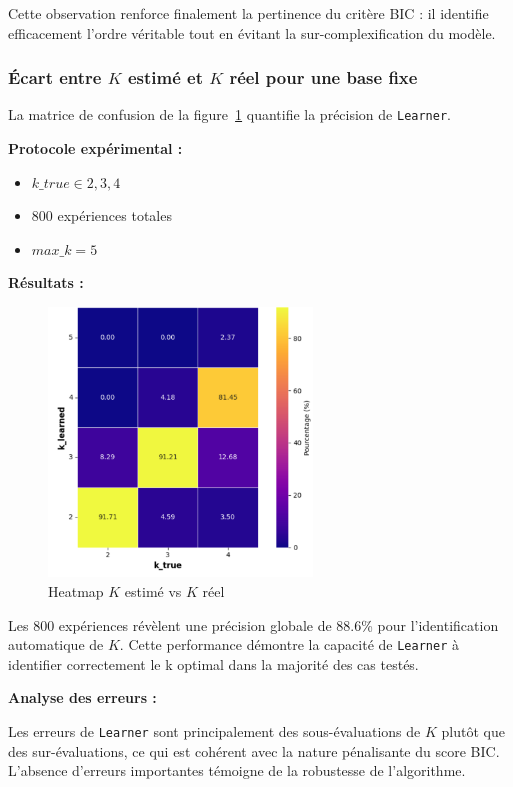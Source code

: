 \documentclass{article}
\begin{document}
Cette observation renforce finalement la pertinence du critère BIC : il identifie efficacement l'ordre véritable tout en
évitant la sur-complexification du modèle.


\subsubsection{Écart entre $K$ estimé et $K$ réel pour une base fixe}

La matrice de confusion de la figure~\ref{fig:kvsk} quantifie la précision de
\texttt{Learner}.

\textbf{Protocole expérimental :}

\begin{itemize}
    \item $k\_true \in {2, 3, 4}$
    \item 800 expériences totales
    \item $max\_k = 5$
\end{itemize}

\textbf{Résultats :}


\begin{figure}[ht]
    \centering
    \includegraphics[width=7cm]{img/HeatmapKvK.png}
    \caption{Heatmap $K$ estimé vs $K$ réel}
    \label{fig:kvsk}
\end{figure}

Les 800 expériences révèlent une précision globale de 88.6\% pour l'identification
automatique de $K$. Cette performance démontre la capacité de \texttt{Learner} à
identifier correctement le k optimal dans la majorité des cas testés.

\textbf{Analyse des erreurs :}

Les erreurs de \texttt{Learner} sont principalement des sous-évaluations de $K$
plutôt que des sur-évaluations, ce qui est cohérent avec la nature pénalisante
du score BIC. L'absence d'erreurs importantes témoigne de la robustesse de
l'algorithme.
\end{document}
